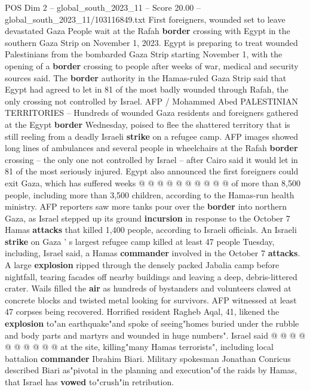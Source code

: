 \begin{textsample}{POS Dim 2 – global\_south\_2023\_11 – Score 20.00 – global\_south\_2023\_11/103116849.txt}  \label{ex:f2_pos_217}
First foreigners, wounded set to leave devastated Gaza People wait at the Rafah \textbf{border} crossing with Egypt in the southern Gaza Strip on November 1, 2023.
Egypt is preparing to treat wounded Palestinians from the bombarded Gaza Strip starting November 1, with the opening of a \textbf{border} crossing to people after weeks of war, medical and security sources said.
The \textbf{border} authority in the Hamas-ruled Gaza Strip said that Egypt had agreed to let in 81 of the most badly wounded through Rafah, the only crossing not controlled by Israel.
AFP / Mohammed Abed PALESTINIAN TERRITORIES -- Hundreds of wounded Gaza residents and foreigners gathered at the Egypt \textbf{border} Wednesday, poised to flee the shattered territory that is still reeling from a deadly Israeli \textbf{strike} on a refugee camp.
AFP images showed long lines of ambulances and several people in wheelchairs at the Rafah \textbf{border} crossing -- the only one not controlled by Israel -- after Cairo said it would let in 81 of the most seriously injured.
Egypt also announced the first foreigners could exit Gaza, which has suffered weeks @ @ @ @ @ @ @ @ @ @ of more than 8,500 people, including more than 3,500 children, according to the Hamas-run health ministry.
AFP reporters saw more tanks pour over the \textbf{border} into northern Gaza, as Israel stepped up its ground \textbf{incursion} in response to the October 7 Hamas \textbf{attacks} that killed 1,400 people, according to Israeli officials.
An Israeli \textbf{strike} on Gaza ' s largest refugee camp killed at least 47 people Tuesday, including, Israel said, a Hamas \textbf{commander} involved in the October 7 \textbf{attacks}.
A large \textbf{explosion} ripped through the densely packed Jabalia camp before nightfall, tearing facades off nearby buildings and leaving a deep, debris-littered crater.
Wails filled the \textbf{air} as hundreds of bystanders and volunteers clawed at concrete blocks and twisted metal looking for survivors.
AFP witnessed at least 47 corpses being recovered.
Horrified resident Ragheb Aqal, 41, likened the \textbf{explosion} to"an earthquake"and spoke of seeing"homes buried under the rubble and body parts and martyrs and wounded in huge numbers".
Israel said @ @ @ @ @ @ @ @ @ @ at the site, killing"many Hamas terrorists", including local battalion \textbf{commander} Ibrahim Biari.
Military spokesman Jonathan Conricus described Biari as"pivotal in the planning and execution"of the raids by Hamas, that Israel has \textbf{vowed} to"crush"in retribution.

\end{textsample}
